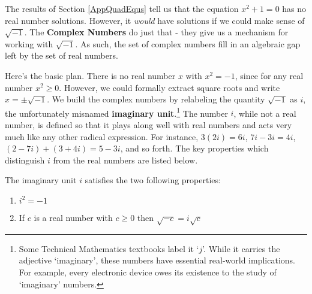 

\setcounter{footnote}{0}

\label{AppCmpNums}

The results of Section \ref{AppQuadEqus} tell us that the equation $x^{2} + 1 = 0$ has no real number solutions. However, it \emph{would} have solutions if we could make sense of $\sqrt{-1}$. The \textbf{Complex Numbers} do just that - they give us a mechanism for working with $\sqrt{-1}$.  As such, the set of complex numbers fill in an algebraic gap left by the set of real numbers.  

Here's the basic plan.  There is no real number $x$ with $x^2 = -1$, since for any real number $x^2 \geq 0$.  However, we could formally extract square roots and write $x = \pm \sqrt{-1}$.  We build the complex numbers by relabeling the quantity $\sqrt{-1}$ as $i$, the unfortunately misnamed \textbf{imaginary unit}.\footnote{Some Technical Mathematics textbooks label it `$j$'.  While it carries the adjective `imaginary', these numbers have essential real-world implications.  For example, every electronic device owes its existence to the study of `imaginary' numbers.}  The number $i$, while not a real number, is defined so that it plays along well with real numbers and acts very much like any other radical expression.  For instance, $3(2i) = 6i$, $7i-3i = 4i$, $(2-7i) + (3 + 4i) = 5-3i$, and so forth.  The key properties which distinguish $i$ from the real numbers are listed below.

\begin{tcolorbox}

\begin{defn} \label{idefn} The imaginary unit $i$ satisfies the two following properties:

\begin{enumerate}

\item  $i^2 = -1$

\item  If $c$ is a real number with $c \geq 0$ then $\sqrt{-c} = i \sqrt{c}$

\end{enumerate}

\end{defn}

\end{tcolorbox}

